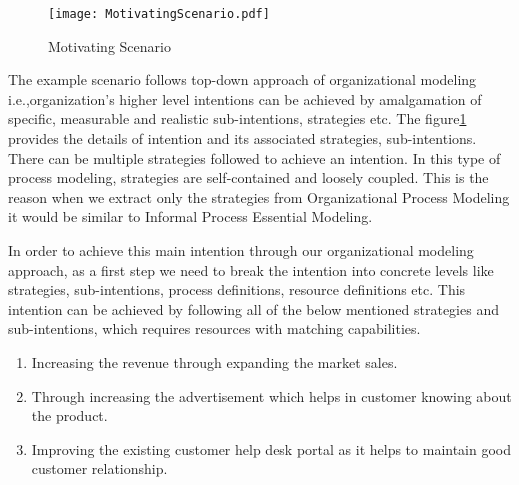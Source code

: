   \begin{figure}
  	\centering
  	\texttt{[image: MotivatingScenario.pdf]}
  	\caption{Motivating Scenario}
  	\label{fig:motivatingscenario}
  \end{figure}
  
 The example scenario follows top-down approach of organizational modeling i.e.,organization's higher level intentions can be achieved by amalgamation of specific, measurable and realistic sub-intentions, strategies etc. The figure\ref{fig:motivatingscenario} provides the details of intention and its associated strategies, sub-intentions. There can be multiple strategies followed to achieve an intention. In this type of process modeling, strategies are self-contained and loosely coupled. This is the reason when we extract only the strategies from Organizational Process Modeling it would be similar to Informal Process Essential Modeling. 
 
 In order to achieve this main intention through our organizational modeling approach, as a first step we need to break the intention into concrete levels like strategies, sub-intentions, process definitions, resource definitions etc. This intention can be achieved by following all of the below mentioned strategies and sub-intentions, which requires resources with matching capabilities. 
 
 \begin{enumerate}
 	\item Increasing the revenue through expanding the market sales. 
 	\item Through increasing the advertisement which helps in customer knowing about the product.
 	\item Improving the existing customer help desk portal as it helps to maintain good customer relationship.
 \end{enumerate}
 
